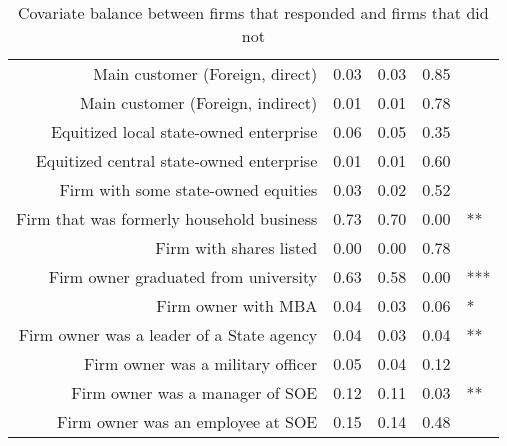 \begin{table}[H]
\begin{tabular}{rrrrl}
  Main customer (Foreign, direct) & 0.03 & 0.03 & 0.85 &  \\ 
  Main customer (Foreign, indirect) & 0.01 & 0.01 & 0.78 &  \\ 
  Equitized local state-owned enterprise & 0.06 & 0.05 & 0.35 &  \\ 
  Equitized central state-owned enterprise & 0.01 & 0.01 & 0.60 &  \\ 
  Firm with some state-owned equities & 0.03 & 0.02 & 0.52 &  \\ 
  Firm that was formerly household business & 0.73 & 0.70 & 0.00 & ** \\ 
  Firm with shares listed & 0.00 & 0.00 & 0.78 &  \\ 
  Firm owner graduated from university & 0.63 & 0.58 & 0.00 & *** \\ 
  Firm owner with MBA & 0.04 & 0.03 & 0.06 & * \\ 
  Firm owner was a leader of a State agency & 0.04 & 0.03 & 0.04 & ** \\ 
  Firm owner was a military officer & 0.05 & 0.04 & 0.12 &  \\ 
  Firm owner was a manager of SOE & 0.12 & 0.11 & 0.03 & ** \\ 
  Firm owner was an employee at SOE & 0.15 & 0.14 & 0.48 &  \\ 
   \hline
\end{tabular}
\caption{Covariate balance between firms that responded and firms that did not}
\label{tab:balance_response}
\end{table}